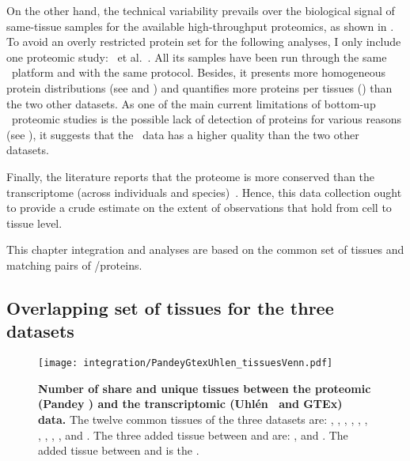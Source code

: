 On the other hand,
the technical variability prevails over
the biological signal of same-tissue samples
for the available high-throughput proteomics,
as shown in .
To avoid an overly restricted protein set for the following analyses,
I only include one proteomic study: \pandey\ et al.~.
All its samples have been run through the same \ms\ platform and
with the same protocol.
Besides, it presents more homogeneous protein distributions
(see  and ) and
quantifies more proteins per tissues ()
than the two other datasets.
As one of the main current limitations of bottom-up \ms\ proteomic studies
is the possible lack of detection of proteins for various reasons
(see ),
it suggests that
the \pandey\ data has a higher quality than the two other datasets.

\vspace{-0.5mm}
Finally, the literature reports that
the proteome is more conserved than the transcriptome
(across individuals and species)~.
Hence, this data collection ought to provide a crude estimate
on the extent of observations that hold from cell to tissue level.

This chapter integration and analyses are based on the common set of tissues
and matching pairs of \mRNA/proteins.

\vspace{-2.5mm}
\subsection{Overlapping set of tissues for the three datasets}

\begin{figure}[!htbp]
    \texttt{[image: integration/PandeyGtexUhlen\_tissuesVenn.pdf]}
    \centering
    \vspace{-5mm}
    \caption[Number of share and unique tissues between the proteomic
    dataset from Pandey \etal\ and the transcriptomic datasets (Uhlén \etal\ and
    Gtex)]{\label{fig:VennTissuePandeyGtexUhlen}\textbf{Number of share and unique
    tissues between the proteomic (Pandey \etal) and the
    transcriptomic (Uhlén \etal\ and GTEx) data.} The twelve common tissues of
    the three datasets are:
    , , , ,
    , , , , ,
    ,  and . The three added
    tissue between  and  are:
    ,  and . The added tissue
    between  and  is the .}
\end{figure}

